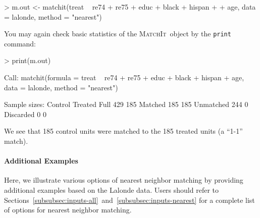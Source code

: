 \documentclass[oneside,letterpaper,titlepage]{article}
\newcommand{\MatchIt}{\textsc{MatchIt}}
\begin{document}
\begin{Schunk}
\begin{Sinput}
> m.out <- matchit(treat ~ re74 + re75 + educ + black + hispan + 
+     age, data = lalonde, method = "nearest")
\end{Sinput}
\end{Schunk}

\noindent You may again check basic statistics of the \MatchIt\ object by the
\texttt{print} command:
\begin{Schunk}
\begin{Sinput}
> print(m.out)
\end{Sinput}
\begin{Soutput}
Call: matchit(formula = treat ~ re74 + re75 + educ + black + hispan +     age, data = lalonde, method = "nearest")

Sample sizes:
          Control Treated
Full          429     185
Matched       185     185
Unmatched     244       0
Discarded       0       0
\end{Soutput}
\end{Schunk}

We see that 185 control units were matched to the 185 treated units (a
``1-1'' match).  

\paragraph{Additional Examples}
Here, we illustrate various options of nearest neighbor matching by
providing additional examples based on the Lalonde data. Users should
refer to
Sections~\ref{subsubsec:inputs-all}~and~\ref{subsubsec:inputs-nearest}
for a complete list of options for nearest neighbor matching.
\end{document}
